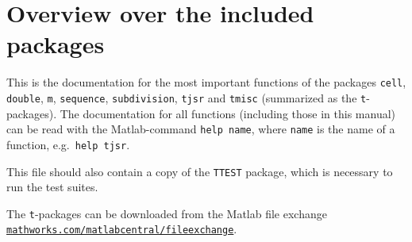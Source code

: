 

\chapter{Overview over the included packages}
This is the documentation for the most important functions of the packages
\texttt{cell}, \texttt{double}, \texttt{m}, \texttt{sequence}, \texttt{subdivision}, \texttt{tjsr} and \texttt{tmisc} (summarized as the \texttt{t}-packages).
The documentation for all functions (including those in this manual) can be read with the Matlab-command 
\texttt{help name}, where \texttt{name} is the name of a function, e.g.\ \texttt{help tjsr}. 

This file should also contain a copy of the \texttt{TTEST} package, which is necessary to run the test suites.

The \texttt{t}-packages can be downloaded from the Matlab file exchange
\href{https://de.mathworks.com/matlabcentral/fileexchange/}{\texttt{mathworks.com/matlabcentral/fileexchange}}.

